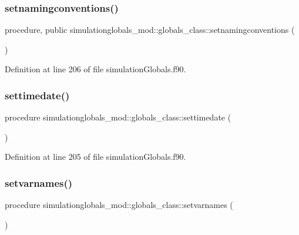 \subsubsection{\texorpdfstring{setnamingconventions()}{setnamingconventions()}}
{\footnotesize\ttfamily procedure, public simulationglobals\+\_\+mod\+::globals\+\_\+class\+::setnamingconventions (\begin{DoxyParamCaption}{ }\end{DoxyParamCaption})}



Definition at line 206 of file simulation\+Globals.\+f90.

\mbox{\label{structsimulationglobals__mod_1_1globals__class_a9afa580356002f4a94376ad3f925cb35}} 
\subsubsection{\texorpdfstring{settimedate()}{settimedate()}}
{\footnotesize\ttfamily procedure simulationglobals\+\_\+mod\+::globals\+\_\+class\+::settimedate (\begin{DoxyParamCaption}{ }\end{DoxyParamCaption})\hspace{0.3cm}{\ttfamily [private]}}



Definition at line 205 of file simulation\+Globals.\+f90.

\mbox{\label{structsimulationglobals__mod_1_1globals__class_ac9fcf75928fccae1c6ac5c98603ed9b8}} 
\subsubsection{\texorpdfstring{setvarnames()}{setvarnames()}}
{\footnotesize\ttfamily procedure simulationglobals\+\_\+mod\+::globals\+\_\+class\+::setvarnames (\begin{DoxyParamCaption}{ }\end{DoxyParamCaption})\hspace{0.3cm}{\ttfamily [private]}}



